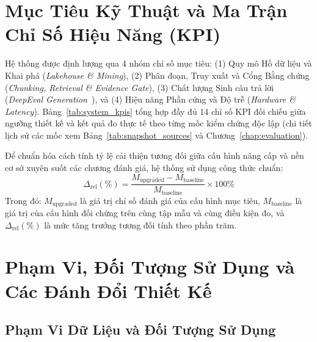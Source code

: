 \section{Mục Tiêu Kỹ Thuật và Ma Trận Chỉ Số Hiệu Năng (KPI)}
\label{sec:ch1_kpis}

Hệ thống được định lượng qua 4 nhóm chỉ số mục tiêu: (1) Quy mô Hồ dữ liệu và Khai phá (\textit{Lakehouse \& Mining}), (2) Phân đoạn, Truy xuất và Cổng Bằng chứng (\textit{Chunking, Retrieval \& Evidence Gate}), (3) Chất lượng Sinh câu trả lời (\textit{DeepEval Generation}~\cite{deepeval2024confident}), và (4) Hiệu năng Phần cứng và Độ trễ (\textit{Hardware \& Latency}). Bảng~\ref{tab:system_kpis} tổng hợp đầy đủ 14 chỉ số KPI đối chiếu giữa ngưỡng thiết kế và kết quả đo thực tế theo từng mốc kiểm chứng độc lập (chi tiết lịch sử các mốc xem Bảng~\ref{tab:snapshot_sources} và Chương~\ref{chap:evaluation}).



Để chuẩn hóa cách tính tỷ lệ cải thiện tương đối giữa cấu hình nâng cấp và nền cơ sở xuyên suốt các chương đánh giá, hệ thống sử dụng công thức chuẩn:
\begin{equation}
  \Delta_{\text{rel}}(\%) = \frac{M_{\text{upgraded}} - M_{\text{baseline}}}{M_{\text{baseline}}} \times 100\%
  \label{eq:ch1_rel_delta}
\end{equation}
\noindent Trong đó: $M_{\text{upgraded}}$ là giá trị chỉ số đánh giá của cấu hình mục tiêu, $M_{\text{baseline}}$ là giá trị của cấu hình đối chứng trên cùng tập mẫu và cùng điều kiện đo, và $\Delta_{\text{rel}}(\%)$ là mức tăng trưởng tương đối tính theo phần trăm.

\section{Phạm Vi, Đối Tượng Sử Dụng và Các Đánh Đổi Thiết Kế}
\label{sec:ch1_scope_tradeoffs}

\subsection{Phạm Vi Dữ Liệu và Đối Tượng Sử Dụng}
\label{sec:ch1_scope}

